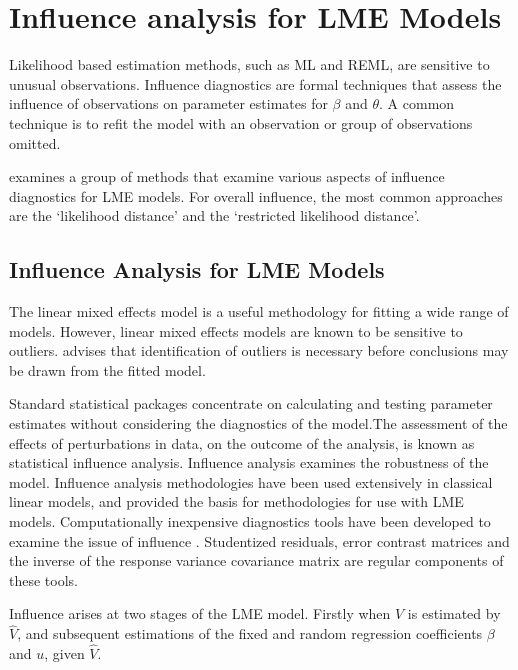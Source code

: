 \documentclass[00-MASTER.tex]{subfiles}
\begin{document}
	\section{Influence analysis for LME Models} %
	
	Likelihood based estimation methods, such as ML and REML, are sensitive to unusual observations. Influence diagnostics are formal techniques that assess the influence of observations on parameter estimates for $\beta$ and $\theta$. A common technique is to refit the model with an observation or group of observations omitted.
	
	\citet{west} examines a group of methods that examine various aspects of influence diagnostics for LME models.
	For overall influence, the most common approaches are the `likelihood distance' and the `restricted likelihood distance'.
	
	
\subsection{Influence Analysis for LME Models} %
The linear mixed effects model is a useful methodology for fitting a wide range of models. However, linear mixed effects models are known to be sensitive to outliers. \citet{CPJ} advises that identification of outliers is necessary before conclusions may be drawn from the fitted model.

Standard statistical packages concentrate on calculating and testing parameter estimates without considering the diagnostics of the model.The assessment of the effects of perturbations in data, on the outcome of the analysis, is known as statistical influence analysis. Influence analysis examines the robustness of the model. Influence analysis methodologies have been used extensively in classical linear models, and provided the basis for methodologies for use with LME models.
Computationally inexpensive diagnostics tools have been developed to examine the issue of influence \citep{Zewotir}.
Studentized residuals, error contrast matrices and the inverse of the response variance covariance matrix are regular components of these tools.

Influence arises at two stages of the LME model. Firstly when $V$ is estimated by $\hat{V}$, and subsequent
estimations of the fixed and random regression coefficients $\beta$ and $u$, given $\hat{V}$.
	
	
\end{document}
